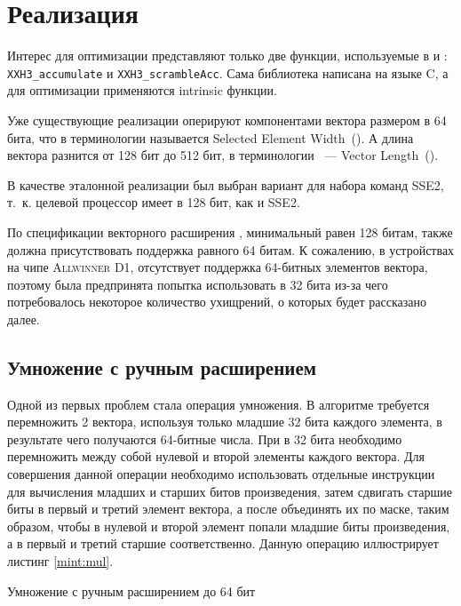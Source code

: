 
\section{Реализация}
Интерес для оптимизации представляют только две функции, используемые в  и : \texttt{XXH3\_accumulate} и \texttt{XXH3\_scrambleAcc}.
Сама библиотека написана на языке \textsc{C}, а для оптимизации применяются intrinsic функции.

Уже существующие реализации оперируют компонентами вектора размером в 64 бита, что в терминологии \riscv{} называется Selected Element Width~(\sew{}).
А длина вектора разнится от 128 бит до 512 бит, в терминологии \riscv{}~--- Vector Length~(\vl{}).

В качестве эталонной реализации был выбран вариант для набора команд \textsc{SSE2}, т.~к. целевой процессор имеет \vl{} в 128 бит, как и \textsc{SSE2}.

По спецификации векторного расширения \riscv{}, минимальный \vl{} равен 128 битам, также должна присутствовать поддержка \sew{} равного 64 битам.
К сожалению, в устройствах на чипе \textsc{Allwinner D1}, отсутствует поддержка 64-битных элементов вектора, поэтому была предпринята попытка использовать \sew{} в 32 бита из-за чего потребовалось некоторое количество ухищрений, о которых будет рассказано далее.

\subsection{Умножение с ручным расширением}
Одной из первых проблем стала операция умножения.
В алгоритме требуется перемножить 2 вектора, используя только младшие 32 бита каждого элемента, в результате чего получаются 64-битные числа.
При \sew{} в 32 бита необходимо перемножить между собой нулевой и второй элементы каждого вектора.
Для совершения данной операции необходимо использовать отдельные инструкции для вычисления младших и старших битов произведения, затем сдвигать старшие биты в первый и третий элемент вектора, а после объединять их по маске, таким образом, чтобы в нулевой и второй элемент попали младшие биты произведения, а в первый и третий старшие соответственно.
Данную операцию иллюстрирует листинг \ref{mint:mul}.
\begin{listing}
	\caption{Умножение с ручным расширением до 64 бит}
	\label{mint:mul}
	\inputminted[breaklines, frame=single]{c}{figures/mul.c}
\end{listing}

